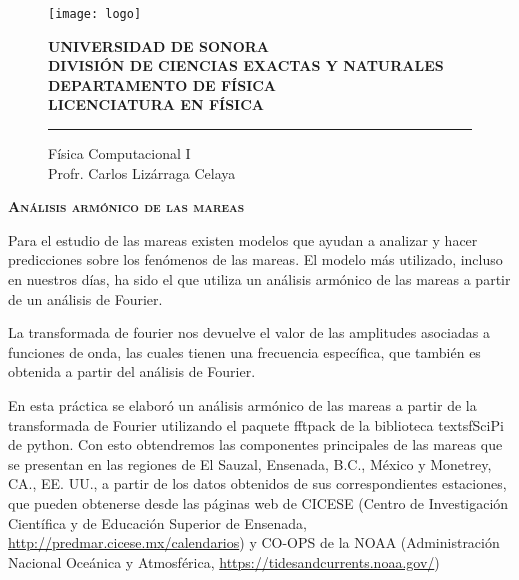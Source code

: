 
\date{23 de abril de 2017}


\begin{titlepage}

    \begin{figure}[ht!]
    \centering
    \texttt{[image: logo]}
    
    \textbf{UNIVERSIDAD DE SONORA \\ DIVISIÓN DE CIENCIAS EXACTAS Y NATURALES \\ DEPARTAMENTO DE FÍSICA \\ LICENCIATURA EN FÍSICA}
	\maketitle
    \hrule \bigskip
    \large{Física Computacional I}\\
	Profr. Carlos Lizárraga Celaya
    \end{figure}
\thispagestyle{empty}

\end{titlepage}

\newpage

\begin{center}
\huge{\textbf{\textsc{Análisis armónico de las mareas}}}
\end{center}
\noindent  Para el estudio de las mareas existen modelos que ayudan a analizar y hacer predicciones sobre los fenómenos de las mareas. El modelo más utilizado, incluso en nuestros días, ha sido el que utiliza un análisis armónico de las mareas a partir de un análisis de Fourier. 

La transformada de fourier nos devuelve el valor de las amplitudes asociadas a funciones de onda, las cuales tienen una frecuencia específica, que también es obtenida a partir del análisis de Fourier.

En esta práctica se elaboró un análisis armónico de las mareas a partir de la transformada de Fourier utilizando el paquete \textsf{fftpack} de la biblioteca textsf{SciPi} de \textsf{python}. Con esto obtendremos las componentes principales de las mareas que se presentan en las regiones de El Sauzal, Ensenada, B.C., México y  Monetrey, CA., EE. UU., a partir de los datos obtenidos de sus correspondientes estaciones, que pueden obtenerse desde las páginas web de CICESE (Centro de Investigación Científica y de Educación Superior de Ensenada, \url{http://predmar.cicese.mx/calendarios})
y CO-OPS de la NOAA (Administración Nacional Oceánica y Atmosférica, \url{https://tidesandcurrents.noaa.gov/})

